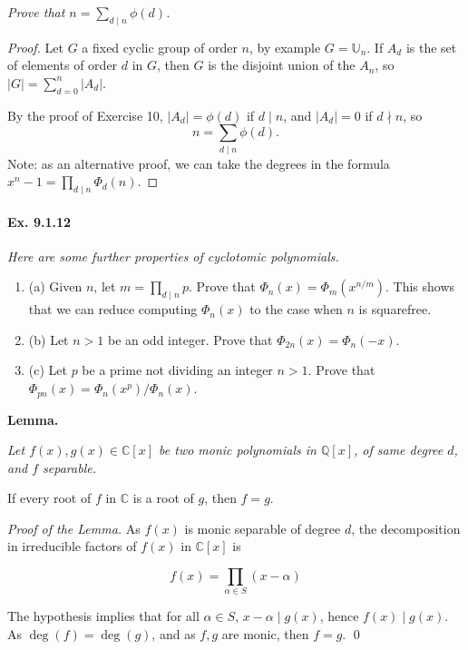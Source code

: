 \documentclass[11pt,a4paper]{article}
\newcommand{\be} {\begin{enumerate}}
\newcommand{\ee} {\end{enumerate}}
\newcommand{\C}{\mathbb{C}}
\newcommand{\U}{\mathbb{U}}
\begin{document}
{\it Prove that $n = \sum_{d\mid n} \phi(d)$.
}

\begin{proof}
Let $G$ a fixed cyclic group of order $n$, by example $G =\U_n$. If $A_d$ is the set of elements of order $d$ in $G$, then  $G$ is the disjoint union of the $A_n$, so $\vert G  \vert = \sum_{d=0}^n \vert A_d \vert$.

By the proof of Exercise 10, $\vert A_d \vert = \phi(d)$ if $d\mid n$, and $\vert A_d \vert = 0$ if $d\nmid n$,  so
$$n = \sum_{d\mid n } \phi(d).$$
Note: as an alternative proof, we can take the degrees in the formula  $x^n-1 = \prod_{d\mid n} \Phi_d(n)$.
\end{proof}

\paragraph{Ex. 9.1.12}

{\it Here are some further properties of cyclotomic polynomials.
\be
\item[(a)] Given $n$, let $m =\prod_{d\mid n} p$. Prove that $\Phi_n(x) = \Phi_m(x^{n/m})$. This shows that we can reduce computing $\Phi_n(x)$ to the case when $n$ is squarefree.
\item[(b)] Let $n>1$ be an odd integer. Prove that $\Phi_{2n}(x) = \Phi_n(-x)$.
\item[(c)] Let $p$ be a prime not dividing an integer $n>1$. Prove that $\Phi_{pn}(x) = \Phi_n(x^p)/\Phi_n(x)$.
\ee
}



{\bf Lemma.} {\it  Let $f(x),g(x) \in \C[x]$ be two monic  polynomials in $\mathbb{Q}[x]$, of same degree $d$, and  $f$ separable.

If every  root of $f$ in $\mathbb{C}$ is a root of $g$, then $f=g$.}



{\it Proof of the Lemma.} 
As $f(x)$ is monic separable of degree $d$, the decomposition in irreducible factors of $f(x)$ in $\mathbb{C}[x]$ is

$$ f(x) = \prod_{\alpha \in S} (x-\alpha)$$  

The hypothesis implies that for all $\alpha \in S$, $x-\alpha \mid g(x)$, hence $f(x) \mid g(x)$. As $\deg(f) = \deg(g)$, and as $f,g$ are monic, then $f=g$.
\qed
\end{document}
